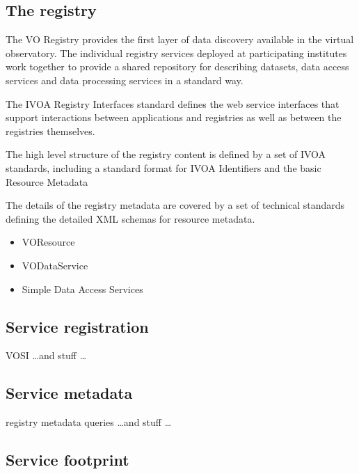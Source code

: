 \documentclass{article}
\begin{document}
\subsection{The registry}

The VO Registry provides the first layer of data discovery available in the
virtual observatory. The individual registry services deployed at participating
institutes work together to provide a shared repository for describing datasets,
data access services and data processing services in a standard way.

The IVOA Registry Interfaces standard
defines the web service interfaces that support interactions between
applications and registries as well as between the registries themselves.

The high level structure of the registry content is defined by a
set of IVOA standards, including a standard format for IVOA Identifiers
and the basic Resource Metadata

The details of the registry metadata are covered by a set of technical
standards defining the detailed XML schemas for resource metadata.
\begin{itemize}
  \item VOResource
  \item VODataService
  \item Simple Data Access Services
\end{itemize}

\subsection{Service registration}

VOSI \ldots and stuff \ldots

\subsection{Service metadata}

registry metadata queries \ldots and stuff \ldots

\subsection{Service footprint}
\end{document}
